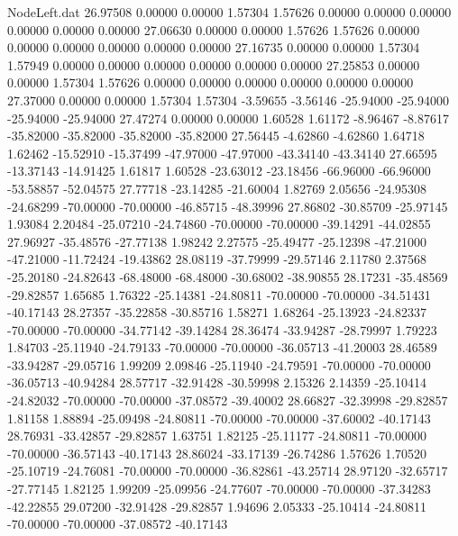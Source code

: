 \begin{filecontents}{NodeLeft.dat}
  26.97508    0.00000    0.00000     1.57304    1.57626    0.00000    0.00000    0.00000    0.00000    0.00000    0.00000
  27.06630    0.00000    0.00000     1.57626    1.57626    0.00000    0.00000    0.00000    0.00000    0.00000    0.00000
  27.16735    0.00000    0.00000     1.57304    1.57949    0.00000    0.00000    0.00000    0.00000    0.00000    0.00000
  27.25853    0.00000    0.00000     1.57304    1.57626    0.00000    0.00000    0.00000    0.00000    0.00000    0.00000
  27.37000    0.00000    0.00000     1.57304    1.57304   -3.59655   -3.56146  -25.94000  -25.94000  -25.94000  -25.94000
  27.47274    0.00000    0.00000     1.60528    1.61172   -8.96467   -8.87617  -35.82000  -35.82000  -35.82000  -35.82000
  27.56445   -4.62860   -4.62860     1.64718    1.62462  -15.52910  -15.37499  -47.97000  -47.97000  -43.34140  -43.34140
  27.66595  -13.37143  -14.91425     1.61817    1.60528  -23.63012  -23.18456  -66.96000  -66.96000  -53.58857  -52.04575
  27.77718  -23.14285  -21.60004     1.82769    2.05656  -24.95308  -24.68299  -70.00000  -70.00000  -46.85715  -48.39996
  27.86802  -30.85709  -25.97145     1.93084    2.20484  -25.07210  -24.74860  -70.00000  -70.00000  -39.14291  -44.02855
  27.96927  -35.48576  -27.77138     1.98242    2.27575  -25.49477  -25.12398  -47.21000  -47.21000  -11.72424  -19.43862
  28.08119  -37.79999  -29.57146     2.11780    2.37568  -25.20180  -24.82643  -68.48000  -68.48000  -30.68002  -38.90855
  28.17231  -35.48569  -29.82857     1.65685    1.76322  -25.14381  -24.80811  -70.00000  -70.00000  -34.51431  -40.17143
  28.27357  -35.22858  -30.85716     1.58271    1.68264  -25.13923  -24.82337  -70.00000  -70.00000  -34.77142  -39.14284
  28.36474  -33.94287  -28.79997     1.79223    1.84703  -25.11940  -24.79133  -70.00000  -70.00000  -36.05713  -41.20003
  28.46589  -33.94287  -29.05716     1.99209    2.09846  -25.11940  -24.79591  -70.00000  -70.00000  -36.05713  -40.94284
  28.57717  -32.91428  -30.59998     2.15326    2.14359  -25.10414  -24.82032  -70.00000  -70.00000  -37.08572  -39.40002
  28.66827  -32.39998  -29.82857     1.81158    1.88894  -25.09498  -24.80811  -70.00000  -70.00000  -37.60002  -40.17143
  28.76931  -33.42857  -29.82857     1.63751    1.82125  -25.11177  -24.80811  -70.00000  -70.00000  -36.57143  -40.17143
  28.86024  -33.17139  -26.74286     1.57626    1.70520  -25.10719  -24.76081  -70.00000  -70.00000  -36.82861  -43.25714
  28.97120  -32.65717  -27.77145     1.82125    1.99209  -25.09956  -24.77607  -70.00000  -70.00000  -37.34283  -42.22855
  29.07200  -32.91428  -29.82857     1.94696    2.05333  -25.10414  -24.80811  -70.00000  -70.00000  -37.08572  -40.17143

\end{filecontents}
